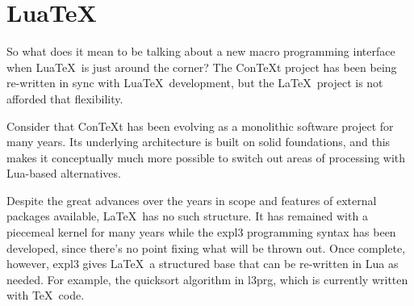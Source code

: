 \documentclass{ltugboat}
\def\pkg#1{\textsf{#1}}
\begin{document}
\section{Lua\TeX}

So what does it mean to be talking about a new macro programming interface
when Lua\TeX\ is just around the corner? The Con\TeX{}t project has been being
re-written in sync with Lua\TeX\ development, but the \LaTeX\ project is not
afforded that flexibility.

Consider that Con\TeX{}t has been evolving as a monolithic software project
for many years. Its underlying architecture is built on solid foundations, and
this makes it conceptually much more possible to switch out areas of
processing with Lua-based alternatives.

Despite the great advances over the years in scope and features of external
packages available, \LaTeX\ has no such structure. It has remained with a
piecemeal kernel for many years while the \pkg{expl3} programming syntax has
been developed, since there's no point fixing what will be thrown out. Once
complete, however, \pkg{expl3} gives \LaTeX\ a structured base that can be
re-written in Lua as needed. For example, the quicksort algorithm in
\pkg{l3prg}, which is currently written with \TeX\ code.
\end{document}
